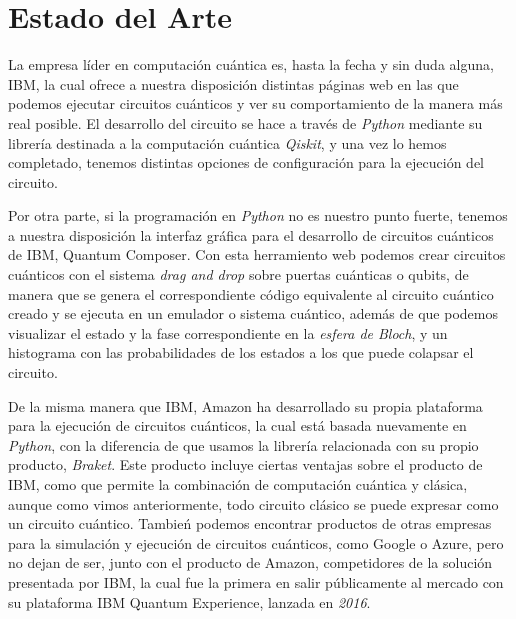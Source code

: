 \documentclass[12pt]{article}
\numberwithin{equation}{section} %
\begin{document}
    \newpage
    \thispagestyle{empty}
    \mbox{}

    \section{Estado del Arte}

    \vspace{5mm}

    La empresa líder en computación cuántica es, hasta la fecha y sin duda alguna, IBM, la cual ofrece a nuestra disposición distintas páginas web en las que podemos ejecutar circuitos cuánticos y ver su comportamiento de la manera más real posible. El desarrollo del circuito se hace a través de \textit{Python} mediante su librería destinada a la computación cuántica \textit{Qiskit}, y una vez lo hemos completado, tenemos distintas opciones de configuración para la ejecución del circuito.

    \vspace{5mm}

    Por otra parte, si la programación en \textit{Python} no es nuestro punto fuerte, tenemos a nuestra disposición la interfaz gráfica para el desarrollo de circuitos cuánticos de IBM, Quantum Composer. Con esta herramiento web podemos crear circuitos cuánticos con el sistema \textit{drag and drop} sobre puertas cuánticas o qubits, de manera que se genera el correspondiente código equivalente al circuito cuántico creado y se ejecuta en un emulador o sistema cuántico, además de que podemos visualizar el estado y la fase correspondiente en la \textit{esfera de Bloch}, y un histograma con las probabilidades de los estados a los que puede colapsar el circuito.
    
    \vspace{5mm}

    De la misma manera que IBM, Amazon ha desarrollado su propia plataforma para la ejecución de circuitos cuánticos, la cual está basada nuevamente en \textit{Python}, con la diferencia de que usamos la librería relacionada con su propio producto, \textit{Braket}. Este producto incluye ciertas ventajas sobre el producto de IBM, como que permite la combinación de computación cuántica y clásica, aunque como vimos anteriormente, todo circuito clásico se puede expresar como un circuito cuántico. Tambień podemos encontrar productos de otras empresas para la simulación y ejecución de circuitos cuánticos, como Google o Azure, pero no dejan de ser, junto con el producto de Amazon, competidores de la solución presentada por IBM, la cual fue la primera en salir públicamente al mercado con su plataforma IBM Quantum Experience, lanzada en \textit{2016}.
\end{document}
